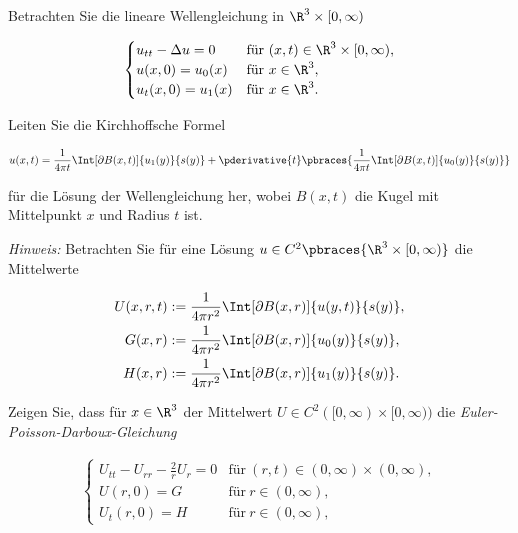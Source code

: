 
\begin{exercise}

Betrachten Sie die lineare Wellengleichung in $\R^3 \times [0, \infty)$

\begin{align*}
    \begin{cases}
        u_{tt} - \Delta u = 0 & \text{für}~ (x, t) \in \R^3 \times [0, \infty), \\
        u(x, 0) = u_0(x)    & \text{für}~ x \in \R^3, \\
        u_t(x, 0) = u_1(x)  & \text{für}~ x \in \R^3.
    \end{cases}
\end{align*}

Leiten Sie die Kirchhoffsche Formel

\begin{align*}
    u(x, t)
    =
    \frac{1}{4 \pi t}
    \Int[\partial B(x, t)]{u_1(y)}{s(y)}
    +
    \pderivative{t}
    \pbraces
    {
        \frac{1}{4 \pi t}
        \Int[\partial B(x, t)]{u_0(y)}{s(y)}
    }
\end{align*}

für die Lösung der Wellengleichung her, wobei $B(x, t)$ die Kugel mit Mittelpunkt $x$ und Radius $t$ ist.

\textit{Hinweis:}
Betrachten Sie für eine Lösung $u \in C^2 \pbraces{\R^3 \times [0, \infty)}$ die Mittelwerte

\begin{align*}
    U(x, r, t) & := \frac{1}{4 \pi r^2} \Int[\partial B(x, r)]{u(y, t)}{s(y)}, \\
    G(x, r)    & := \frac{1}{4 \pi r^2} \Int[\partial B(x, r)]{u_0(y)}{s(y)}, \\
    H(x, r)    & := \frac{1}{4 \pi r^2} \Int[\partial B(x, r)]{u_1(y)}{s(y)}.
\end{align*}

Zeigen Sie, dass für $x \in \R^3$ der Mittelwert $U \in C^2([0, \infty) \times [0, \infty))$  die \textit{Euler-Poisson-Darboux-Gleichung}

\begin{align*}
    \begin{cases}
        U_{tt} - U_{rr} - \frac{2}{r} U_r = 0 & \text{für}~(r, t) \in (0, \infty) \times (0, \infty), \\
        U(r, 0) = G                             & \text{für}~ r \in (0, \infty), \\
        U_t(r, 0)                           = H & \text{für}~ r \in (0, \infty),
    \end{cases}
\end{align*}


\end{exercise}
